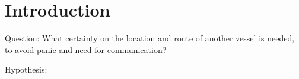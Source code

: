\chapter*{Introduction}

Question: What certainty on the location and route of another vessel is needed, to avoid panic and need for communication?

Hypothesis: